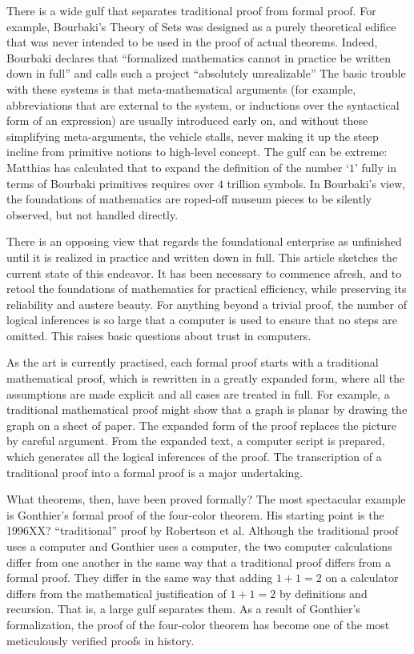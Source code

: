 \documentclass{llncs}
\begin{document}
There is a wide gulf that separates traditional proof from formal proof.
For example, Bourbaki's Theory of Sets was designed as a purely theoretical
edifice that was never intended to be used in the proof of actual theorems.
Indeed, Bourbaki declares that ``formalized mathematics cannot
in practice be written down in full'' and calls such a project
``absolutely unrealizable''  %
The basic trouble with these systems is that meta-mathematical arguments (for
example, abbreviations that are external to the system, or
inductions over the syntactical form of an expression) 
are usually introduced early on, and without these simplifying meta-arguments,
the vehicle stalls, never making it up the steep incline from primitive notions to 
high-level concept.   The gulf can be extreme: Matthias has calculated
that to expand the definition of the number `$1$' fully in terms of Bourbaki primitives requires
over $4$ trillion symbols.
In Bourbaki's view, 
the foundations of mathematics are roped-off museum pieces
to be silently observed, 
but not handled directly.

There is an opposing view that regards the 
foundational enterprise
as unfinished until it is realized in practice and written down in full.
This article sketches the current state of this endeavor.
It has been necessary to commence afresh, and to retool the foundations
of mathematics for practical efficiency, while preserving
its reliability and austere beauty.  For anything beyond a trivial
proof, the number of logical inferences is so large that a computer is
used to ensure that no steps are omitted.   This raises basic questions
about trust in computers.

As the art is currently practised, each formal proof starts with a traditional
mathematical proof, which is rewritten in a greatly expanded form, where all the
assumptions are made explicit and all cases are treated in full.
For example, a traditional mathematical proof might show that a graph is
planar by drawing the graph on a sheet of paper.  The expanded form of
the proof  replaces the picture by careful argument.  From the
expanded text, a computer script is prepared, which generates all
the logical inferences of the proof.  The transcription of a traditional
proof into a formal proof is a major undertaking.

What theorems, then, have been proved formally?  The most spectacular
example is Gonthier's formal proof of the four-color theorem.  His
starting point is the 1996XX? ``traditional''
proof by Robertson et al.  Although the traditional proof uses a computer
and Gonthier uses a computer,  the two computer calculations
differ from one another in the same way that a traditional proof differs
from a formal proof.  They differ in the same way that adding $1+1=2$ on
a calculator differs from the mathematical
justification of $1+1=2$ by definitions
and recursion.  That is, a large gulf separates them.
As a result of Gonthier's formalization,
the proof of the four-color theorem has become one of the most meticulously verified proofs
in history.
\end{document}

